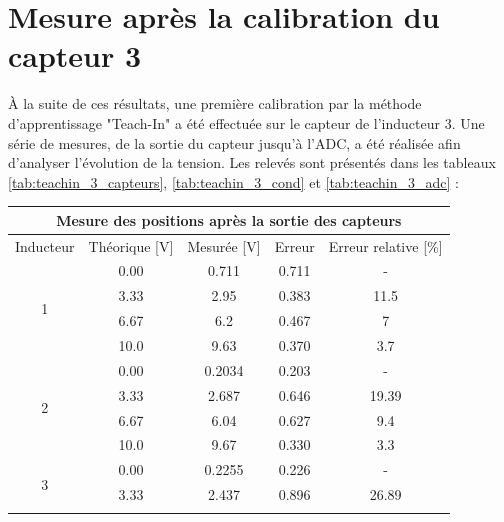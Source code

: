 \section{Mesure après la calibration du capteur 3}
À la suite de ces résultats, une première calibration par la méthode d'apprentissage "Teach-In" a été effectuée sur le capteur de l'inducteur 3. Une série de mesures, de la sortie du capteur jusqu'à l'ADC, a été réalisée afin d'analyser l'évolution de la tension. Les relevés sont présentés dans les tableaux \ref{tab:teachin_3_capteurs}, \ref{tab:teachin_3_cond} et \ref{tab:teachin_3_adc} :

\begin{table}[H]
    \centering
    \begin{tabular}{|c|c|c|c|c|}
        \hline
        \multicolumn{5}{|c|}{\textbf{Mesure des positions après la sortie des capteurs}}             \\ \hline
        Inducteur          & Théorique {[}V{]} & Mesurée {[}V{]} & Erreur & Erreur relative {[}\%{]} \\ \hline
        \multirow{4}{*}{1} & 0.00              & 0.711           & 0.711  & -                        \\ \cline{2-5}
                           & 3.33              & 2.95            & 0.383  & 11.5                     \\ \cline{2-5}
                           & 6.67              & 6.2             & 0.467  & 7                        \\ \cline{2-5}
                           & 10.0              & 9.63            & 0.370  & 3.7                      \\ \hline
        \multirow{4}{*}{2} & 0.00              & 0.2034          & 0.203  & -                        \\ \cline{2-5}
                           & 3.33              & 2.687           & 0.646  & 19.39                    \\ \cline{2-5}
                           & 6.67              & 6.04            & 0.627  & 9.4                      \\ \cline{2-5}
                           & 10.0              & 9.67            & 0.330  & 3.3                      \\ \hline
        \multirow{4}{*}{3} & 0.00              & 0.2255          & 0.226  & -                        \\ \cline{2-5}
                           & 3.33              & 2.437           & 0.896  & 26.89                    \\ \cline{2-5}

\end{tabular}
\end{table}
